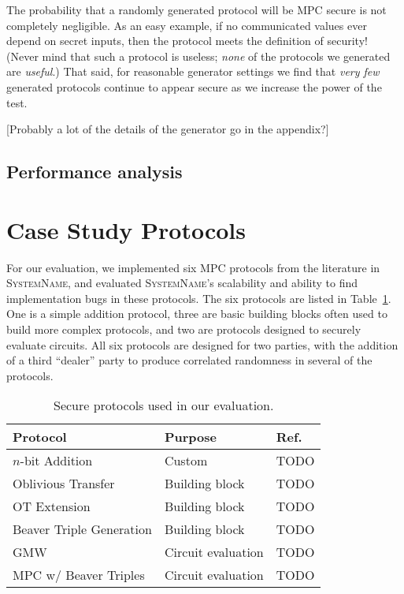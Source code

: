 \documentclass[conference]{IEEEtran}
\newcommand{\system}{\textsc{SystemName}\xspace}
\begin{document}
The probability that a randomly generated protocol will be MPC secure is not completely negligible.
As an easy example, if no communicated values ever depend on secret inputs, then the protocol meets the definition of security!
(Never mind that such a protocol is useless; \textit{none} of the protocols we generated are \textit{useful}.)
That said, for reasonable generator settings we find that \textit{very few} generated protocols
continue to appear secure as we increase the power of the test.

[Probably a lot of the details of the generator go in the appendix?]

\subsection{Performance analysis}


\section{Case Study Protocols}

For our evaluation, we implemented six MPC protocols from the literature in \system, and evaluated \system's scalability and ability to find implementation bugs in these protocols. The six protocols are listed in Table~\ref{tbl:protocols}. One is a simple addition protocol, three are basic building blocks often used to build more complex protocols, and two are protocols designed to securely evaluate circuits. All six protocols are designed for two parties, with the addition of a third ``dealer'' party to produce correlated randomness in several of the protocols.

\begin{table}
\centering
  \begin{tabular}{|l | l|l|}
    \hline
    \textbf{Protocol} & \textbf{Purpose} & \textbf{Ref.} \\
    \hline
    $n$-bit Addition & Custom & TODO \\
    Oblivious Transfer & Building block & TODO \\
    OT Extension & Building block & TODO \\
    Beaver Triple Generation & Building block & TODO \\
    GMW & Circuit evaluation & TODO \\
    MPC w/ Beaver Triples & Circuit evaluation & TODO \\
    \hline
  \end{tabular}
  \caption{Secure protocols used in our evaluation.}
  \label{tbl:protocols}
\end{table}
\end{document}
